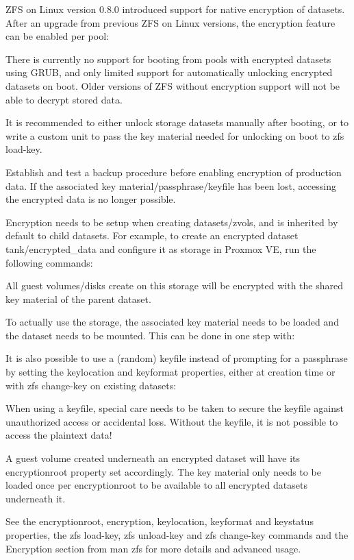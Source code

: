 ZFS on Linux version 0.8.0 introduced support for native encryption of datasets. After an upgrade from previous ZFS on Linux versions, the encryption feature can be enabled per pool:

There is currently no support for booting from pools with encrypted datasets using GRUB, and only limited support for automatically unlocking encrypted datasets on boot. Older versions of ZFS without encryption support will not be able to decrypt stored data.

It is recommended to either unlock storage datasets manually after booting, or to write a custom unit to pass the key material needed for unlocking on boot to zfs load-key.

Establish and test a backup procedure before enabling encryption of production data. If the associated key material/passphrase/keyfile has been lost, accessing the encrypted data is no longer possible.

Encryption needs to be setup when creating datasets/zvols, and is inherited by default to child datasets. For example, to create an encrypted dataset tank/encrypted_data and configure it as storage in Proxmox VE, run the following commands:

All guest volumes/disks create on this storage will be encrypted with the shared key material of the parent dataset.

To actually use the storage, the associated key material needs to be loaded and the dataset needs to be mounted. This can be done in one step with:

It is also possible to use a (random) keyfile instead of prompting for a passphrase by setting the keylocation and keyformat properties, either at creation time or with zfs change-key on existing datasets:

When using a keyfile, special care needs to be taken to secure the keyfile against unauthorized access or accidental loss. Without the keyfile, it is not possible to access the plaintext data!

A guest volume created underneath an encrypted dataset will have its encryptionroot property set accordingly. The key material only needs to be loaded once per encryptionroot to be available to all encrypted datasets underneath it.

See the encryptionroot, encryption, keylocation, keyformat and keystatus properties, the zfs load-key, zfs unload-key and zfs change-key commands and the Encryption section from man zfs for more details and advanced usage.

